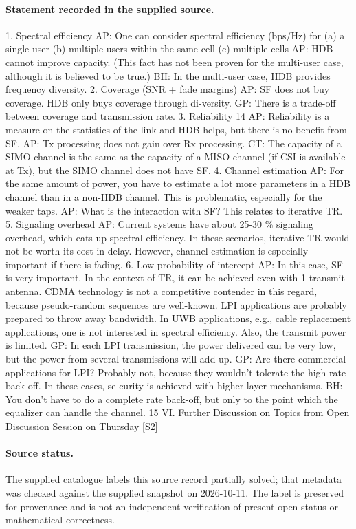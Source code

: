 \documentclass[11pt]{article}
\newcommand{\sref}[2]{\hyperlink{source:#1:#2}{[S#2]}}
\begin{document}
\paragraph{Statement recorded in the supplied source.}
1. Spectral efficiency AP: One can consider spectral efficiency (bps/Hz) for (a) a single user (b) multiple users within the same cell (c) multiple cells AP: HDB cannot improve capacity. (This fact has not been proven for the multi-user case, although it is believed to be true.) BH: In the multi-user case, HDB provides frequency diversity. 2. Coverage (SNR + fade margins) AP: SF does not buy coverage. HDB only buys coverage through di-versity. GP: There is a trade-off between coverage and transmission rate. 3. Reliability 14 AP: Reliability is a measure on the statistics of the link and HDB helps, but there is no benefit from SF. AP: Tx processing does not gain over Rx processing. CT: The capacity of a SIMO channel is the same as the capacity of a MISO channel (if CSI is available at Tx), but the SIMO channel does not have SF. 4. Channel estimation AP: For the same amount of power, you have to estimate a lot more parameters in a HDB channel than in a non-HDB channel. This is problematic, especially for the weaker taps. AP: What is the interaction with SF? This relates to iterative TR. 5. Signaling overhead AP: Current systems have about 25-30 \% signaling overhead, which eats up spectral efficiency. In these scenarios, iterative TR would not be worth its cost in delay. However, channel estimation is especially important if there is fading. 6. Low probability of intercept AP: In this case, SF is very important. In the context of TR, it can be achieved even with 1 transmit antenna. CDMA technology is not a competitive contender in this regard, because pseudo-random sequences are well-known. LPI applications are probably prepared to throw away bandwidth. In UWB applications, e.g., cable replacement applications, one is not interested in spectral efficiency. Also, the transmit power is limited. GP: In each LPI transmission, the power delivered can be very low, but the power from several transmissions will add up. GP: Are there commercial applications for LPI? Probably not, because they wouldn't tolerate the high rate back-off. In these cases, se-curity is achieved with higher layer mechanisms. BH: You don't have to do a complete rate back-off, but only to the point which the equalizer can handle the channel. 15 VI. Further Discussion on Topics from Open Discussion Session on Thursday \sref{statement}{2}
\paragraph{Source status.}
The supplied catalogue labels this source record partially solved; that metadata was checked against the supplied snapshot on 2026-10-11. The label is preserved for provenance and is not an independent verification of present open status or mathematical correctness.
\end{document}
